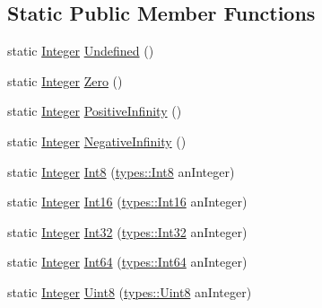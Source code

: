 \subsection*{Static Public Member Functions}
\begin{DoxyCompactItemize}
\item 
static \hyperlink{classlibrary_1_1core_1_1types_1_1_integer}{Integer} \hyperlink{classlibrary_1_1core_1_1types_1_1_integer_a142c2df49031b787daf30673c73fcad7}{Undefined} ()
\item 
static \hyperlink{classlibrary_1_1core_1_1types_1_1_integer}{Integer} \hyperlink{classlibrary_1_1core_1_1types_1_1_integer_a908c9b717859421a99d6d8c269685211}{Zero} ()
\item 
static \hyperlink{classlibrary_1_1core_1_1types_1_1_integer}{Integer} \hyperlink{classlibrary_1_1core_1_1types_1_1_integer_a807320f164c841288eafff5f49470c00}{Positive\+Infinity} ()
\item 
static \hyperlink{classlibrary_1_1core_1_1types_1_1_integer}{Integer} \hyperlink{classlibrary_1_1core_1_1types_1_1_integer_aa8151c3b615012ec215d20da6de593bd}{Negative\+Infinity} ()
\item 
static \hyperlink{classlibrary_1_1core_1_1types_1_1_integer}{Integer} \hyperlink{classlibrary_1_1core_1_1types_1_1_integer_ae0a1da7739a3990f61ee8a56b3f4cd6a}{Int8} (\hyperlink{namespacelibrary_1_1core_1_1types_a31bb31acb8e07271b66571cf8e6eafee}{types\+::\+Int8} an\+Integer)
\item 
static \hyperlink{classlibrary_1_1core_1_1types_1_1_integer}{Integer} \hyperlink{classlibrary_1_1core_1_1types_1_1_integer_ae91520c03f3f2455580c98ffdc431a5f}{Int16} (\hyperlink{namespacelibrary_1_1core_1_1types_a150247fa2cd1b258b8e5950efcaecfc9}{types\+::\+Int16} an\+Integer)
\item 
static \hyperlink{classlibrary_1_1core_1_1types_1_1_integer}{Integer} \hyperlink{classlibrary_1_1core_1_1types_1_1_integer_a3adfbe3b3972643d486a2a8f781a5d9f}{Int32} (\hyperlink{namespacelibrary_1_1core_1_1types_acaf2598d96f2239dc55e54628da77876}{types\+::\+Int32} an\+Integer)
\item 
static \hyperlink{classlibrary_1_1core_1_1types_1_1_integer}{Integer} \hyperlink{classlibrary_1_1core_1_1types_1_1_integer_a24c417fe94624194efd4d3ffc301c0b3}{Int64} (\hyperlink{namespacelibrary_1_1core_1_1types_aaa5045e0d51ac9cff3c0aeff2b792c8c}{types\+::\+Int64} an\+Integer)
\item 
static \hyperlink{classlibrary_1_1core_1_1types_1_1_integer}{Integer} \hyperlink{classlibrary_1_1core_1_1types_1_1_integer_abf6d5cb5d0100ee859e35181d0287b61}{Uint8} (\hyperlink{namespacelibrary_1_1core_1_1types_a2fb690dd0eb982f92a642dbd0c985662}{types\+::\+Uint8} an\+Integer)

\end{DoxyCompactItemize}
